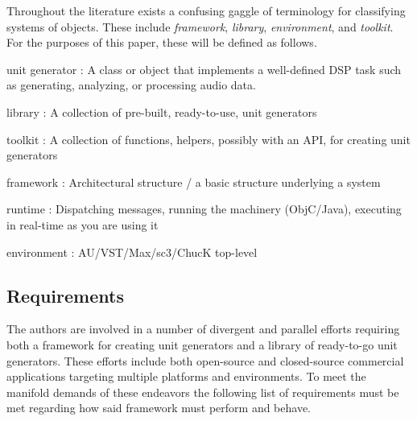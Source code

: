 \documentclass[twoside,10pt]{article}
\newenvironment{packed_item}{
\begin{itemize}
  \setlength{\itemsep}{1pt}
  \setlength{\parskip}{0pt}
  \setlength{\parsep}{0pt}
}{\end{itemize}}
\begin{document}
Throughout the literature exists a confusing gaggle of terminology for classifying systems of objects.  These include \emph{framework}, \emph{library}, \emph{environment}, and \emph{toolkit}.  For the purposes of this paper, these will be defined as follows.  

\begin{packed_item}%
	\item unit generator : A class or object that implements a well-defined DSP task such as generating, analyzing, or processing audio data.
	\item library        : A collection of pre-built, ready-to-use, unit generators
	\item toolkit	     : A collection of functions, helpers, possibly with an API, for creating unit generators
	\item framework      : Architectural structure / a basic structure underlying a system
	\item runtime        : Dispatching messages, running the machinery (ObjC/Java), executing in real-time as you are using it
	\item environment    : AU/VST/Max/sc3/ChucK top-level
\end{packed_item}%



\subsection{Requirements} %

The authors are involved in a number of divergent and parallel efforts requiring both a framework for creating unit generators and a library of ready-to-go unit generators.  These efforts include both open-source and closed-source commercial applications targeting multiple platforms and environments.  To meet the manifold demands of these endeavors the following list of requirements must be met regarding how said framework must perform and behave.
\end{document}

